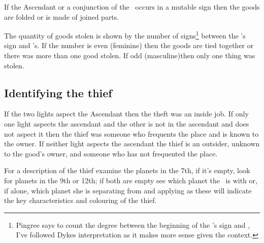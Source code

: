 If the Ascendant or a conjunction of the \Moon\, occurs in a mutable sign then the goods are folded or is made of joined parts.

The quantity of goods stolen is shown by the number of signs\footnote{Pingree says to count the degree between the beginning of the \Moon's sign and \Mercury, I've followed Dykes interpretation as it makes more sense given the context.} between the \Moon's sign and  \Mercury's.  If the number is even (feminine) then the goods are tied together or there was more than one good stolen. If odd (masculine)then only one thing was stolen.

\subsection{Identifying the thief}
If the two lights aspect the Ascendant then the theft was an inside job.  If only one light aspects the ascendant and the other is not in the ascendant and does not aspect it then the thief was someone  who frequents the place and is known to the owner. If neither light aspects the ascendant the thief is an outsider, unknown to the good's owner, and someone who has not frequented the place.

For a description of the thief examine the planets in the 7th, if it's empty, look for planets in the 9th or 12th; if both are empty see which planet the \Moon\, is with or, if alone, which planet she is separating from and applying as these will indicate the key characteristics and colouring of the thief.


